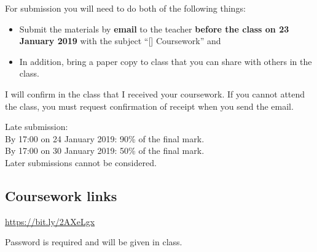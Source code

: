 For submission you will need to do both of the following things:
\begin{itemize}
    \item Submit the materials by \textbf{email} to the teacher \textbf{before the class on 23 January 2019} with the subject ``[\coursenospace] Coursework'' and %
    \item In addition, bring a paper copy to class that you can share with others in the class.
\end{itemize}

I will confirm in the class that I received your coursework. If you cannot attend the class, you must request confirmation of receipt when you send the email.

Late submission:\\
By 17:00 on 24 January 2019: 90\% of the final mark.\\
By 17:00 on 30 January 2019: 50\% of the final mark.\\
Later submissions cannot be considered.

\subsection{Coursework links}

\url{https://bit.ly/2AXeLgx}

Password is required and will be given in class.
